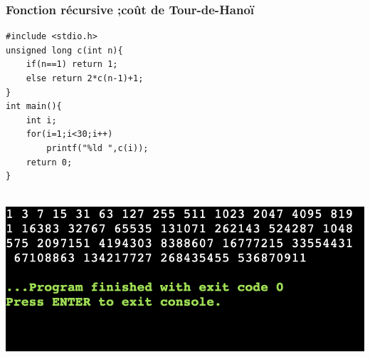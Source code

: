 \documentclass{beamer}
\begin{document}
\begin{frame}[fragile]
\frametitle{Fonction récursive ;coût de Tour-de-Hanoï}
\begin{multicols}{2}
\begin{verbatim}  
#include <stdio.h>
unsigned long c(int n){
    if(n==1) return 1;
    else return 2*c(n-1)+1;
}
int main(){ 
    int i;
    for(i=1;i<30;i++)
        printf("%ld ",c(i));
    return 0; 
}
\end{verbatim}
\\

\includegraphics[scale=0.4]{hanoi3.png} 
\end{multicols}
\end{frame}
\end{document}

